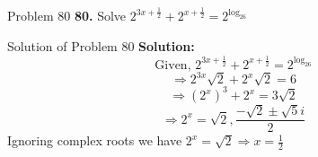 \documentclass[aspectratio=1610,8pt]{beamer}
\begin{document}
\begin{frame}{Problem 80}
  \textbf{80.} Solve $2^{3x + \frac{1}{2}} + 2^{x + \frac{1}{2}} = 2^{\log_26}$
\end{frame}
\begin{frame}{Solution of Problem 80}
  \textbf{Solution:} $$\text{Given,~}2^{3x + \frac{1}{2}} + 2^{x + \frac{1}{2}} = 2^{\log_26}$$
  $$\Rightarrow 2^{3x}\sqrt{2} + 2^x\sqrt{2} = 6$$
  $$\Rightarrow (2^x)^3 + 2^x = 3\sqrt{2}$$
  $$\Rightarrow 2^x = \sqrt{2}, \frac{-\sqrt{2}\pm\sqrt{5}i}{2}$$
  Ignoring complex roots we have $2^x = \sqrt{2} \Rightarrow x = \frac{1}{2}$
\end{frame}
\end{document}
